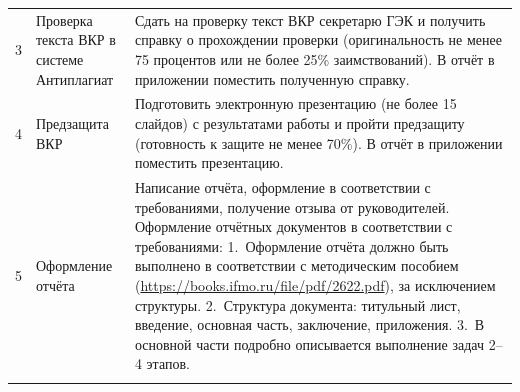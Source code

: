 \begin{longtable}{|c|p{5.5cm}|p{8.5cm}|}
	3          & Проверка текста ВКР в системе Антиплагиат  &
	Сдать на проверку текст ВКР секретарю ГЭК и получить справку о прохождении проверки (оригинальность не менее 75 процентов или не более 25\% заимствований). В отчёт в приложении поместить полученную справку.                                                                                                                                                                                                                                                                                                                                                                                                                                                                                                                                                                                                                                                                                                         \\ \hhline{|-|-|-|}

	4          & Предзащита ВКР                             &
	Подготовить электронную презентацию (не более 15 слайдов) с результатами работы и пройти предзащиту (готовность к защите не менее 70\%). В отчёт в приложении поместить презентацию.                                                                                                                                                                                                                                                                                                                                                                                                                                                                                                                                                                                                                                                                                                                                   \\ \hhline{|-|-|-|}

	5          & Оформление отчёта                          &
	Написание отчёта, оформление в соответствии с требованиями, получение отзыва от руководителей. Оформление отчётных документов в соответствии с требованиями: 1.~Оформление отчёта должно быть выполнено в соответствии с методическим пособием (\url{https://books.ifmo.ru/file/pdf/2622.pdf}), за исключением структуры. 2.~Структура документа: титульный лист, введение, основная часть, заключение, приложения. 3.~В основной части подробно описывается выполнение задач 2--4 этапов.                                                                                                                                                                                                                                                                                                                                                                                                                             \\ \hhline{|-|-|-|}


\end{longtable}
